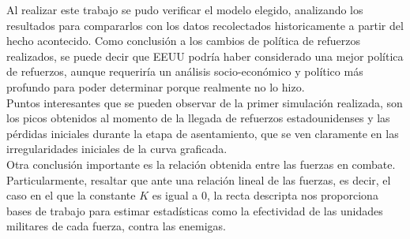 \documentclass{sig-alternate}
\begin{document}
Al realizar este trabajo se pudo verificar el modelo elegido, analizando los resultados para compararlos con los datos recolectados historicamente
a partir del hecho acontecido. Como conclusión a los cambios de política de refuerzos realizados, se puede decir que EEUU podría haber considerado una
mejor política de refuerzos, aunque requeriría un análisis socio-económico y político más profundo para poder determinar porque realmente no
lo hizo.\\
Puntos interesantes que se pueden observar de la primer simulación realizada, son los picos obtenidos al momento de la llegada de refuerzos
estadounidenses y las pérdidas iniciales durante la etapa de asentamiento, que se ven claramente en las irregularidades iniciales de la curva 
graficada.\\
Otra conclusión importante es la relación obtenida entre las fuerzas en combate. Particularmente, resaltar que ante una relación lineal de las
fuerzas, es decir, el caso en el que la constante $K$ es igual a $0$, la recta descripta nos proporciona bases de trabajo para estimar estadísticas
como la efectividad de las unidades militares de cada fuerza, contra las enemigas.
\end{document}
